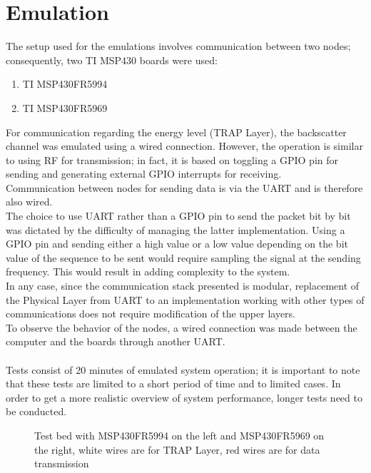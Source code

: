 \section{Emulation}
\label{sec:Simulation}
The setup used for the emulations involves communication between two nodes; consequently, two TI MSP430 boards were used:
\begin{enumerate}
\item TI MSP430FR5994
\item TI MSP430FR5969
\end{enumerate}
For communication regarding the energy level (TRAP Layer), the backscatter channel was emulated using a wired connection. However, the operation is similar to using RF for transmission; in fact, it is based on toggling a GPIO pin for sending and generating external GPIO interrupts for receiving.\\
Communication between nodes for sending data is via the UART and is therefore also wired.\\
The choice to use UART rather than a GPIO pin to send the packet bit by bit was dictated by the difficulty of managing the latter implementation. Using a GPIO pin and sending either a high value or a low value depending on the bit value of the sequence to be sent would require sampling the signal at the sending frequency. This would result in adding complexity to the system.\\
In any case, since the communication stack presented is modular, replacement of the Physical Layer from UART to an implementation working with other types of communications does not require modification of the upper layers.\\
To observe the behavior of the nodes, a wired connection was made between the computer and the boards through another UART.\\\\
Tests consist of 20 minutes of emulated system operation;
it is important to note that these tests are limited to a short period of time and to limited cases. In order to get a more realistic overview of system performance, longer tests need to be conducted.\\
\begin{figure}[H]
\centerline{}
\caption{\footnotesize \centering Test bed with MSP430FR5994 on the left and MSP430FR5969 on the right, white wires are for TRAP Layer, red wires are for data transmission}
\label{fig:testBed}
\end{figure}
